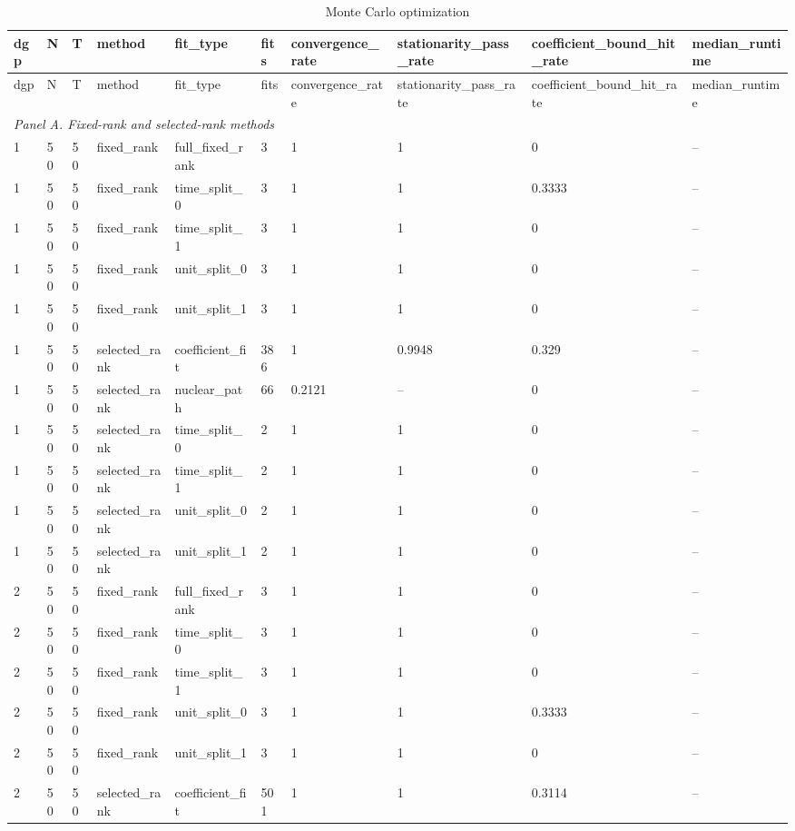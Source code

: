 \begingroup
\small
\begin{longtable}{llllllllll}
\caption{Monte Carlo optimization}\label{tab:mc-optimization}\\
\toprule
dgp & N & T & method & fit\_type & fits & convergence\_rate & stationarity\_pass\_rate & coefficient\_bound\_hit\_rate & median\_runtime \\
\midrule
\endfirsthead
\toprule
dgp & N & T & method & fit\_type & fits & convergence\_rate & stationarity\_pass\_rate & coefficient\_bound\_hit\_rate & median\_runtime \\
\midrule
\endhead
\multicolumn{10}{l}{\textit{Panel A. Fixed-rank and selected-rank methods}} \\
1 & 50 & 50 & fixed\_rank & full\_fixed\_rank & 3 & 1 & 1 & 0 & -- \\
1 & 50 & 50 & fixed\_rank & time\_split\_0 & 3 & 1 & 1 & 0.3333 & -- \\
1 & 50 & 50 & fixed\_rank & time\_split\_1 & 3 & 1 & 1 & 0 & -- \\
1 & 50 & 50 & fixed\_rank & unit\_split\_0 & 3 & 1 & 1 & 0 & -- \\
1 & 50 & 50 & fixed\_rank & unit\_split\_1 & 3 & 1 & 1 & 0 & -- \\
1 & 50 & 50 & selected\_rank & coefficient\_fit & 386 & 1 & 0.9948 & 0.329 & -- \\
1 & 50 & 50 & selected\_rank & nuclear\_path & 66 & 0.2121 & -- & 0 & -- \\
1 & 50 & 50 & selected\_rank & time\_split\_0 & 2 & 1 & 1 & 0 & -- \\
1 & 50 & 50 & selected\_rank & time\_split\_1 & 2 & 1 & 1 & 0 & -- \\
1 & 50 & 50 & selected\_rank & unit\_split\_0 & 2 & 1 & 1 & 0 & -- \\
1 & 50 & 50 & selected\_rank & unit\_split\_1 & 2 & 1 & 1 & 0 & -- \\
2 & 50 & 50 & fixed\_rank & full\_fixed\_rank & 3 & 1 & 1 & 0 & -- \\
2 & 50 & 50 & fixed\_rank & time\_split\_0 & 3 & 1 & 1 & 0 & -- \\
2 & 50 & 50 & fixed\_rank & time\_split\_1 & 3 & 1 & 1 & 0 & -- \\
2 & 50 & 50 & fixed\_rank & unit\_split\_0 & 3 & 1 & 1 & 0.3333 & -- \\
2 & 50 & 50 & fixed\_rank & unit\_split\_1 & 3 & 1 & 1 & 0 & -- \\
2 & 50 & 50 & selected\_rank & coefficient\_fit & 501 & 1 & 1 & 0.3114 & -- \\

\end{longtable}
